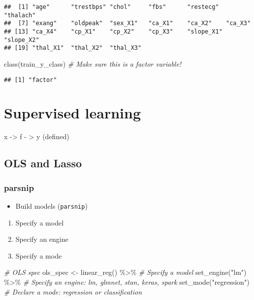 \documentclass[
]{book}
\newenvironment{Shaded}{\begin{snugshade}}{\end{snugshade}}
\newcommand{\CommentTok}[1]{\textcolor[rgb]{0.56,0.35,0.01}{\textit{#1}}}
\newcommand{\FunctionTok}[1]{\textcolor[rgb]{0.00,0.00,0.00}{#1}}
\newcommand{\NormalTok}[1]{#1}
\newcommand{\OtherTok}[1]{\textcolor[rgb]{0.56,0.35,0.01}{#1}}
\newcommand{\SpecialCharTok}[1]{\textcolor[rgb]{0.00,0.00,0.00}{#1}}
\newcommand{\StringTok}[1]{\textcolor[rgb]{0.31,0.60,0.02}{#1}}
\providecommand{\tightlist}{%
  \setlength{\itemsep}{0pt}\setlength{\parskip}{0pt}}
\begin{document}
\begin{verbatim}
##  [1] "age"      "trestbps" "chol"     "fbs"      "restecg"  "thalach" 
##  [7] "exang"    "oldpeak"  "sex_X1"   "ca_X1"    "ca_X2"    "ca_X3"   
## [13] "ca_X4"    "cp_X1"    "cp_X2"    "cp_X3"    "slope_X1" "slope_X2"
## [19] "thal_X1"  "thal_X2"  "thal_X3"
\end{verbatim}

\begin{Shaded}
\begin{Highlighting}[]
\FunctionTok{class}\NormalTok{(train\_y\_class) }\CommentTok{\# Make sure this is a factor variable!}
\end{Highlighting}
\end{Shaded}

\begin{verbatim}
## [1] "factor"
\end{verbatim}

\hypertarget{supervised-learning}{%
\section{Supervised learning}\label{supervised-learning}}

x -\textgreater{} f - \textgreater{} y (defined)

\hypertarget{ols-and-lasso}{%
\subsection{OLS and Lasso}\label{ols-and-lasso}}

\hypertarget{parsnip}{%
\subsubsection{parsnip}\label{parsnip}}

\begin{itemize}
\tightlist
\item
  Build models (\texttt{parsnip})
\end{itemize}

\begin{enumerate}
\def\labelenumi{\arabic{enumi}.}
\tightlist
\item
  Specify a model
\item
  Specify an engine
\item
  Specify a mode
\end{enumerate}

\begin{Shaded}
\begin{Highlighting}[]
\CommentTok{\# OLS spec }
\NormalTok{ols\_spec }\OtherTok{\textless{}{-}} \FunctionTok{linear\_reg}\NormalTok{() }\SpecialCharTok{\%\textgreater{}\%} \CommentTok{\# Specify a model }
  \FunctionTok{set\_engine}\NormalTok{(}\StringTok{"lm"}\NormalTok{) }\SpecialCharTok{\%\textgreater{}\%} \CommentTok{\# Specify an engine: lm, glmnet, stan, keras, spark }
  \FunctionTok{set\_mode}\NormalTok{(}\StringTok{"regression"}\NormalTok{) }\CommentTok{\# Declare a mode: regression or classification}
\end{Highlighting}
\end{Shaded}
\end{document}
